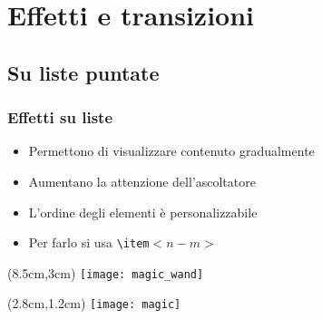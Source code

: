 \section{Effetti e transizioni}
\subsection{Su liste puntate}
\begin{frame}
  \frametitle{Effetti su liste}
  
  \begin{itemize}
   \item<1-> Permettono di visualizzare contenuto gradualmente
   \item<2-> Aumentano la attenzione dell'ascoltatore
   \item<4-> L'ordine degli elementi è personalizzabile
   \item<3-> Per farlo si usa \texttt{\textbackslash item}$<n - m>$
  \end{itemize}
  
  
 \begin{textblock*}{5cm}(8.5cm,3cm)
    \texttt{[image: magic\_wand]}
  \end{textblock*}
  
  
 \begin{textblock*}{5cm}(2.8cm,1.2cm)
    \texttt{[image: magic]}
  \end{textblock*}

\end{frame}
 
